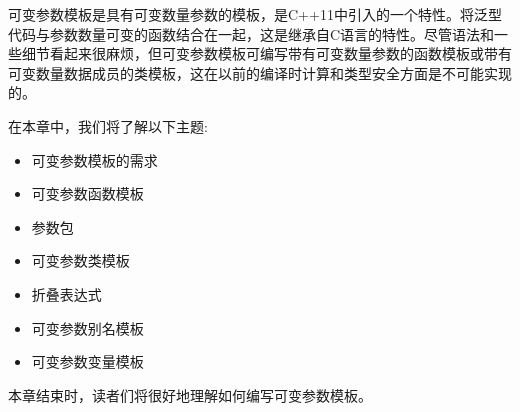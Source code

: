 可变参数模板是具有可变数量参数的模板，是C++11中引入的一个特性。将泛型代码与参数数量可变的函数结合在一起，这是继承自C语言的特性。尽管语法和一些细节看起来很麻烦，但可变参数模板可编写带有可变数量参数的函数模板或带有可变数量数据成员的类模板，这在以前的编译时计算和类型安全方面是不可能实现的。

在本章中，我们将了解以下主题:

\begin{itemize}
\item
可变参数模板的需求

\item
可变参数函数模板

\item
参数包

\item
可变参数类模板

\item
折叠表达式

\item
可变参数别名模板

\item
可变参数变量模板
\end{itemize}

本章结束时，读者们将很好地理解如何编写可变参数模板。































